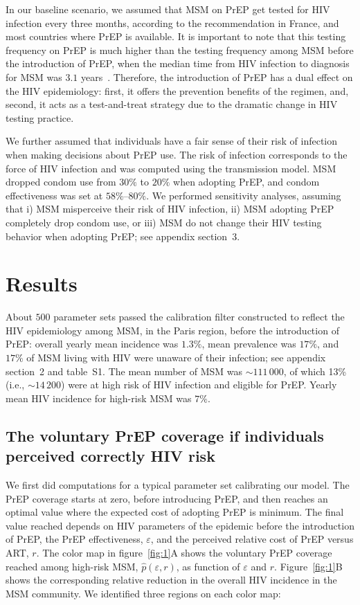 \documentclass[preprint,review,12pt]{article}			%
\begin{document}
In our baseline scenario, we assumed that MSM on PrEP get tested for HIV infection every three months, according to the recommendation in France,\cite{CNSANRS2018} and most countries where PrEP is available. It is important to note that this testing frequency on PrEP is much higher than the testing frequency among MSM before the introduction of PrEP, when the median time from HIV infection to diagnosis for MSM was $3.1$ years~\cite{Marty2019}. Therefore, the introduction of PrEP has a dual effect on the HIV epidemiology: first, it offers the prevention benefits of the regimen, and, second, it acts as a test-and-treat strategy\cite{Kretzschmar2013,WHO2016} due to the dramatic change in HIV testing practice. 

We further assumed that individuals have a fair sense of their risk of infection when making decisions about PrEP use. The risk of infection corresponds to the force of HIV infection and was computed using the transmission model. MSM dropped condom use from $30\%$ to $20\%$ when adopting PrEP,\cite{Molina2015} and condom effectiveness was set at $58\%$--$80\%$.\cite{Smith2015} We performed sensitivity analyses, assuming that i) MSM misperceive their risk of HIV infection, ii) MSM adopting PrEP completely drop condom use, or iii) MSM do not change their HIV testing behavior when adopting PrEP; see appendix section~3. 

\section{Results} \label{sec:Results}

About $500$ parameter sets passed the calibration filter constructed to reflect the HIV epidemiology among MSM, in the Paris region, before the introduction of PrEP: overall yearly mean incidence was $1.3\%$, mean prevalence was $17\%$, and $17\%$ of MSM living with HIV were unaware of their infection; see appendix section~2 and table~S1. The mean number of MSM was $\sim 111\,000$, of which 13\% (i.e., $\sim 14\,200$) were at high risk of HIV infection and eligible for PrEP. Yearly mean HIV incidence for high-risk MSM was $7\%$. 


\subsection{The voluntary PrEP coverage if individuals perceived correctly HIV risk} \label{subsec:VoluntaryPrEP} 
 
We first did computations for a typical parameter set calibrating our model. The PrEP coverage starts at zero, before introducing PrEP, and then reaches an optimal value where the expected cost of adopting PrEP is minimum. The final value reached depends on HIV parameters of the epidemic before the introduction of PrEP, the PrEP effectiveness, $\varepsilon$, and the perceived relative cost of PrEP versus ART, $r$. The color map in figure~\ref{fig:1}A shows the voluntary PrEP coverage reached among high-risk MSM, $\hat{p}(\varepsilon,r)$, as function of $\varepsilon$ and $r$. Figure~\ref{fig:1}B shows the corresponding relative reduction in the overall HIV incidence in the MSM community. We identified three regions on each color map:
\end{document}
